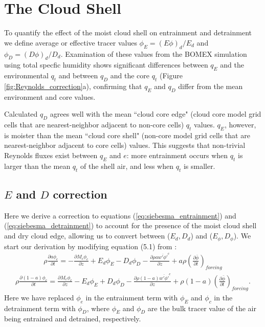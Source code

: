 \documentclass[12pt]{article}
\begin{document}

\section{The Cloud Shell}

To quantify the effect of the moist cloud shell on entrainment and detrainment
we define average or effective tracer values $\phi_E = (E\phi)_d / E_d$ and 
$\phi_D = (D\phi)_d / D_d$.  Examination of these values from the BOMEX 
simulation using total specfic humidity shows significant differences between 
$q_E$ and the environmental $q_t$ and between $q_D$ and the core $q_t$ (Figure 
\ref{fig:Reynolds_correction}a), confirming that $q_E$ and $q_D$ differ from
the mean environment and core values.

Calculated $q_D$ agrees well with the mean ``cloud core edge" (cloud core model 
grid cells that are nearest-neighbor adjacent to non-core cells) $q_t$ values.  
$q_E$, however, is moister than the mean ``cloud core shell" (non-core model 
grid cells that are nearest-neighbor adjacent to core cells) values.  This 
suggests that non-trivial Reynolds fluxes exist between $q_E$ and $e$: more 
entrainment occurs when $q_t$ is larger than the mean $q_t$ of the shell air, 
and less when $q_t$ is smaller.


\subsection{$E$ and $D$ correction}
  
Here we derive a correction to equations (\ref{eq:siebesma_entrainment}) and 
(\ref{eq:siebesma_detrainment}) to account for the presence of the moist cloud 
shell and dry cloud edge, allowing us to convert between ($E_d, D_d$) and 
($E_\phi, D_\phi$).  We start our derivation by modifying equation (5.1) from
\cite{Siebesma1995}:
\begin{eqnarray}
  \label{eq:entrainment_derivation_1}
    \rho \frac{\partial a \phi_c}{\partial t} 
    = - \frac{\partial M_c \phi_c}{\partial z} 
    + E_d \phi_E - D_d \phi_D
    - \frac{\partial \rho a \overline{w' \phi'}^c}{\partial z} 
    + a \rho \left(\frac{\partial \bar{\phi}}{\partial t}\right)_{forcing}
\end{eqnarray}
\begin{eqnarray}
  \label{eq:detrainment_derivation_1}
    \rho \frac{\partial (1 - a) \phi_e}{\partial t}
    = \frac{\partial M_c \phi_e}{\partial z} 
    - E_d \phi_E + D_d \phi_D
    - \frac{\partial \rho (1 - a) \overline{w' \phi'}^e}{\partial z} 
    + \rho (1 - a) \left(\frac{\partial \bar{\phi}}{\partial t}\right)_{forcing}.
\end{eqnarray}
Here we have replaced $\phi_e$ in the entrainment term with $\phi_E$ and 
$\phi_c$ in the detrainment term with $\phi_D$, where $\phi_E$ and $\phi_D$ are 
the bulk tracer value of the air being entrained and detrained, respectively.
\end{document}
